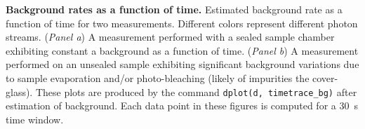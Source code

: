 \label{fig:bg_timetrace} \textbf{Background rates as a function of time.} 
Estimated background rate as a function of time for two \usalex measurements. Different colors represent different photon streams. (\textit{Panel a}) A measurement performed with a sealed sample chamber exhibiting constant a background as a function of time. (\textit{Panel b}) A measurement performed on an unsealed sample exhibiting significant background variations due to sample evaporation and/or photo-bleaching (likely of impurities the cover-glass). 
These plots are produced by the command
\texttt{dplot(d, timetrace\_bg)} after estimation of background.
Each data point in these figures is computed for a 30~s time window.
